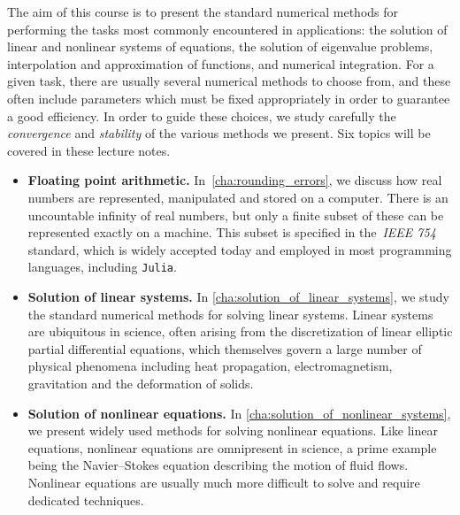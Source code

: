 The aim of this course is to present the standard numerical methods for performing the tasks most commonly encountered in applications:
the solution of linear and nonlinear systems of equations,
the solution of eigenvalue problems,
interpolation and approximation of functions,
and numerical integration.
For a given task,
there are usually several numerical methods to choose from,
and these often include parameters which must be fixed appropriately in order to guarantee a good efficiency.
In order to guide these choices,
we study carefully the \emph{convergence} and \emph{stability} of the various methods we present.
Six topics will be covered in these lecture notes.
\begin{itemize}
    \item
        \textbf{Floating point arithmetic.}
        In~\cref{cha:rounding_errors},
        we discuss how real numbers are represented, manipulated and stored on a computer.
        There is an uncountable infinity of real numbers,
        but only a finite subset of these can be represented exactly on a machine.
        This subset is specified in the~\emph{IEEE 754} standard,
        which is widely accepted today and employed in most programming languages, including \texttt{Julia}.

    \item
        \textbf{Solution of linear systems.}
        In \cref{cha:solution_of_linear_systems},
        we study the standard numerical methods for solving linear systems.
        Linear systems are ubiquitous in science,
        often arising from the discretization of linear elliptic partial differential equations,
        which themselves govern a large number of physical phenomena including heat propagation, electromagnetism, gravitation and the deformation of solids.

    \item
        \textbf{Solution of nonlinear equations.}
        In \cref{cha:solution_of_nonlinear_systems},
        we present widely used methods for solving nonlinear equations.
        Like linear equations, nonlinear equations are omnipresent in science,
        a prime example being the Navier--Stokes equation describing the motion of fluid flows.
        Nonlinear equations are usually much more difficult to solve and require dedicated techniques.


\end{itemize}
